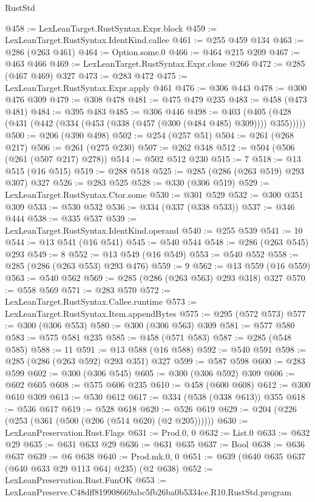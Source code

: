 \begin{lexlean}{RustStd}
\begin{coremodule}
@458 := LexLeanTarget.RustSyntax.Expr.block
@459 := LexLeanTarget.RustSyntax.IdentKind.callee
@461 := @255 @459 @134
@463 := @286 (@263 @461)
@464 := Option.some.{0}
@466 := @464 @215 @209
@467 := @463 @466
@469 := LexLeanTarget.RustSyntax.Expr.clone @266
@472 := @285 (@467 @469) @327
@473 := @283 @472
@475 := LexLeanTarget.RustSyntax.Expr.apply @461
@476 := @306 @443
@478 := @300 @476 @309
@479 := @308 @478
@481 := @475 @479 @235
@483 := @458 (@473 @481)
@484 := @395 @483
@485 := @306 @446
@498 := @403 (@405 (@428 (@431 (@442 (@334 (@453 (@338 (@457 (@300 (@484 @485) @309)))) @355)))))
@500 := @206 (@390 @498)
@502 := @254 (@257 @51)
@504 := @261 (@268 @217)
@506 := @261 (@275 @230)
@507 := @262 @348
@512 := @504 (@506 (@261 (@507 @217) @278))
@514 := @502 @512 @230
@515 := 7
@518 := @13 @515 (@16 @515)
@519 := @288 @518
@525 := @285 (@286 (@263 @519) @293 @307) @327
@526 := @283 @525
@528 := @330 (@306 @519)
@529 := LexLeanTarget.RustSyntax.Ctor.some
@530 := @301 @529
@532 := @300 @351 @309
@533 := @530 @532
@536 := @334 (@337 (@338 @533))
@537 := @346 @444
@538 := @335 @537
@539 := LexLeanTarget.RustSyntax.IdentKind.operand
@540 := @255 @539
@541 := 10
@544 := @13 @541 (@16 @541)
@545 := @540 @544
@548 := @286 (@263 @545) @293
@549 := 8
@552 := @13 @549 (@16 @549)
@553 := @540 @552
@558 := @285 (@286 (@263 @553) @293 @476)
@559 := 9
@562 := @13 @559 (@16 @559)
@563 := @540 @562
@569 := @285 (@286 (@263 @563) @293 @318) @327
@570 := @558 @569
@571 := @283 @570
@572 := LexLeanTarget.RustSyntax.Callee.runtime
@573 := LexLeanTarget.RustSyntax.Item.appendBytes
@575 := @295 (@572 @573)
@577 := @300 (@306 @553)
@580 := @300 (@306 @563) @309
@581 := @577 @580
@583 := @575 @581 @235
@585 := @458 (@571 @583)
@587 := @285 (@548 @585)
@588 := 11
@591 := @13 @588 (@16 @588)
@592 := @540 @591
@598 := @285 (@286 (@263 @592) @293 @351) @327
@599 := @587 @598
@600 := @283 @599
@602 := @300 (@306 @545)
@605 := @300 (@306 @592) @309
@606 := @602 @605
@608 := @575 @606 @235
@610 := @458 (@600 @608)
@612 := @300 @610 @309
@613 := @530 @612
@617 := @334 (@538 (@338 @613)) @355
@618 := @536 @617
@619 := @528 @618
@620 := @526 @619
@629 := @204 (@226 (@253 (@361 (@500 (@206 (@514 @620) (@2 @205))))))
@630 := LexLeanPreservation.Rust.Flags
@631 := Prod.{0, 0}
@632 := List.{0}
@633 := @632 @29
@635 := @631 @633 @29
@636 := @631 @635
@637 := Bool
@638 := @636 @637
@639 := @6 @638
@640 := Prod.mk.{0, 0}
@651 := @639 (@640 @635 @637 (@640 @633 @29 @113 @64) @235) (@2 @638)
@652 := LexLeanPreservation.Rust.FunOK
@653 := LexLeanPreserve.C48dff819908669abc5fb26ba0b5334ce.R10.RustStd.program

\end{coremodule}
\end{lexlean}
